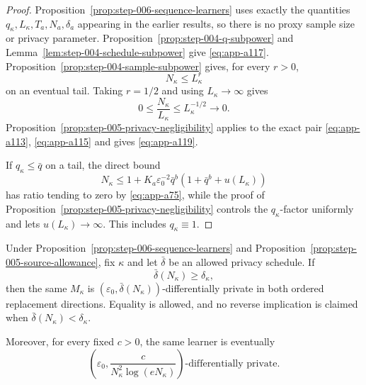 \begin{proof}
Proposition~\ref{prop:step-006-sequence-learners} uses exactly the
quantities \(q_\kappa,L_\kappa,T_a,N_a,\delta_a\) appearing in the
earlier results, so there is no proxy sample size or privacy
parameter.  Proposition~\ref{prop:step-004-q-subpower} and
Lemma~\ref{lem:step-004-schedule-subpower} give \eqref{eq:app-a117}.
Proposition~\ref{prop:step-004-sample-subpower} gives, for every
\(r>0\),
\begin{equation}
N_\kappa\leq L_\kappa^r
\label{eq:app-a120}
\end{equation}
on an eventual tail.  Taking \(r=1/2\) and using
\(L_\kappa\to\infty\) gives
\begin{equation}
0\leq\frac{N_\kappa}{L_\kappa}
\leq L_\kappa^{-1/2}
\longrightarrow0.
\label{eq:app-a121}
\end{equation}
Proposition~\ref{prop:step-005-privacy-negligibility} applies to the
exact pair \eqref{eq:app-a113}, \eqref{eq:app-a115} and gives \eqref{eq:app-a119}.

If \(q_\kappa\leq\bar q\) on a tail, the direct bound
\[
N_\kappa
\leq
1+K_a\varepsilon_0^{-2}\bar q^b
(1+\bar q^b+u(L_\kappa))
\]
has ratio tending to zero by \eqref{eq:app-a75}, while the proof of
Proposition~\ref{prop:step-005-privacy-negligibility} controls the
\(q_\kappa\)-factor uniformly and lets \(u(L_\kappa)\to\infty\).
This includes \(q_\kappa\equiv1\).
\end{proof}

\begin{lemma}
\label{lem:step-006-privacy-relaxation}
Under Proposition~\ref{prop:step-006-sequence-learners} and
Proposition~\ref{prop:step-005-source-allowance}, fix \(\kappa\) and
let \(\bar\delta\) be an allowed privacy schedule.  If
\begin{equation}
\bar\delta(N_\kappa)\geq\delta_\kappa,
\label{eq:app-a122}
\end{equation}
then the same \(M_\kappa\) is
\((\varepsilon_0,\bar\delta(N_\kappa))\)-differentially private in
both ordered replacement directions.  Equality is allowed, and no
reverse implication is claimed when
\(\bar\delta(N_\kappa)<\delta_\kappa\).

Moreover, for every fixed \(c>0\), the same learner is eventually
\begin{equation}
\left(
\varepsilon_0,
\frac{c}{N_\kappa^2\log(eN_\kappa)}
\right)\text{-differentially private}.
\label{eq:app-a123}
\end{equation}
\end{lemma}

